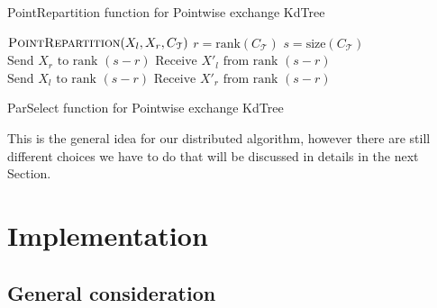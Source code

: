 \documentclass[amssymb, aps,nofootinbib, superscriptaddress, notitlepage]{revtex4}
\begin{document}
\begin{algorithm}
\caption{PointRepartition function for Pointwise exchange KdTree}\label{alg:P2P_PointRepartition}
\begin{algorithmic}
\State $\textsc{PointRepartition}(X_l,X_r, C_\mathcal{T})$
\State $r = \text{rank}(C_\mathcal{T})$
\State $s = \text{size}(C_\mathcal{T})$
    \State $\text{Send } X_r \text{ to rank }  (s-r)$
    \State $\text{Receive }  X'_l \text{ from rank }  (s-r)$
\Else
    \State $\text{Send } X_l \text{ to rank }  (s-r)$
      \State $\text{Receive } X'_r \text{ from rank } (s-r)$   
\EndIf 
\end{algorithmic}
\end{algorithm}

\begin{algorithm}
\caption{ParSelect function for Pointwise exchange KdTree}\label{alg:P2P_ParSelect}
\begin{algorithmic}
  \Else
  \EndIf
  \EndFor
  \Else
\EndIf 
\end{algorithmic}
\end{algorithm}

This is the general idea for our distributed algorithm, however there are still different choices we have to do that will be discussed in details  in the next Section.

\section{Implementation}
\subsection{General consideration}
\end{document}
